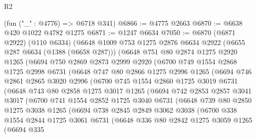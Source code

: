 \begin{lexlean}{R2}
\begin{coremodule}
    (fun ("_" : @4776) => @6718 @341)
@6866 := @4775 @2663
@6870 := @6638 @420 @1022 @4782 @1275
@6871 := @1247 @6634
@7050 := @6870
    (@6871 @2922)
    (@110 @6334)
    (@6648
      @1009
      @753
      @1275
      @2876
      @6634
      @2922
      (@6655 @287 @6634 (@1388 (@6658 @287)))
      (@6648
        @751
        @80
        @2874
        @1275
        @2920
        @1265
        (@6694
          @750
          @2869
          @2873
          @2999
          @2920
          (@6700
            @749
            @1554
            @2868
            @1725
            @2998
            @6731
            (@6648
              @747
              @80
              @2866
              @1275
              @2996
              @1265
              (@6694
                @746
                @2861
                @2865
                @3020
                @2996
                (@6700
                  @745
                  @1554
                  @2860
                  @1725
                  @3019
                  @6731
                  (@6648
                    @743
                    @80
                    @2858
                    @1275
                    @3017
                    @1265
                    (@6694
                      @742
                      @2853
                      @2857
                      @3041
                      @3017
                      (@6700
                        @741
                        @1554
                        @2852
                        @1725
                        @3040
                        @6731
                        (@6648
                          @739
                          @80
                          @2850
                          @1275
                          @3038
                          @1265
                          (@6694
                            @738
                            @2845
                            @2849
                            @3062
                            @3038
                            (@6700
                              @338
                              @1554
                              @2844
                              @1725
                              @3061
                              @6731
                              (@6648
                                @336
                                @80
                                @2842
                                @1275
                                @3059
                                @1265
                                (@6694
                                  @335

\end{coremodule}
\end{lexlean}
